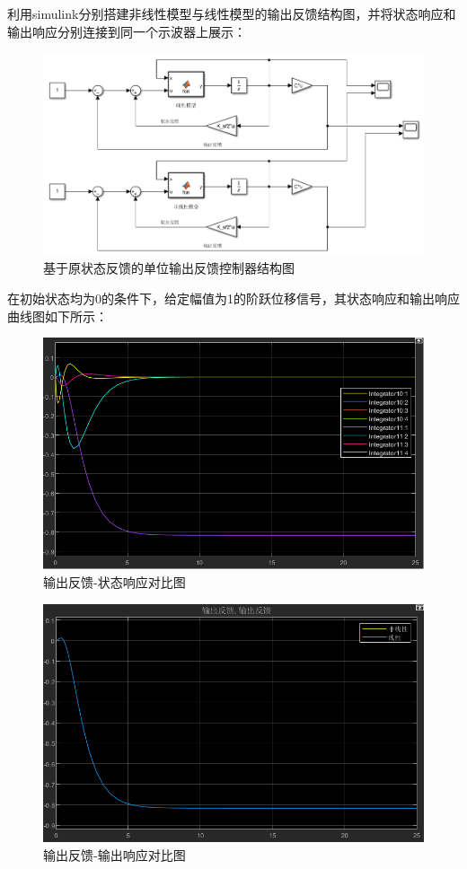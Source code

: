 \documentclass[UTF8]{article}
\begin{document}
利用simulink分别搭建非线性模型与线性模型的输出反馈结构图，并将状态响应和输出响应分别连接到同一个示波器上展示：
\begin{figure}[H]
    \centering %
    \includegraphics[width=.6\textwidth]{figure/倒立摆-输出反馈结构图.png} 
    \caption{基于原状态反馈的单位输出反馈控制器结构图} %
\end{figure}

在初始状态均为0的条件下，给定幅值为1的阶跃位移信号，其状态响应和输出响应曲线图如下所示：
\begin{figure}[H]
    \centering %
    \includegraphics[width=.6\textwidth]{figure/倒立摆-输出反馈-响应对比.png} 
    \caption{输出反馈-状态响应对比图} %
\end{figure}
\begin{figure}[H]
    \centering %
    \includegraphics[width=.6\textwidth]{figure/倒立摆-输出反馈-输出对比.png}
    \caption{输出反馈-输出响应对比图} %
\end{figure}
\end{document}
